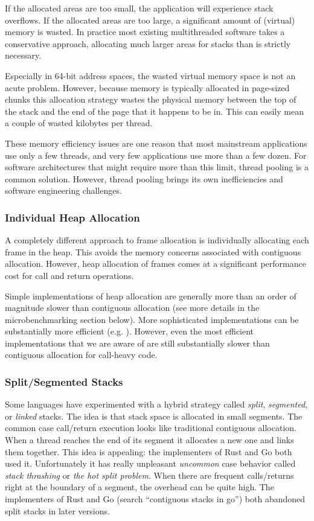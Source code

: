 \documentclass[9pt,preprint]{sigplanconf}
\begin{document}
If the allocated areas are too small, the application will experience stack overflows.
If the allocated areas are too large, a significant amount of (virtual) memory is wasted.
In practice most existing multithreaded software takes a conservative approach, allocating much larger areas for stacks than is strictly necessary.

Especially in 64-bit address spaces, the wasted virtual memory space is not an acute problem.
However, because memory is typically allocated in page-sized chunks this allocation strategy wastes the physical memory between the top of the stack and the end of the page that it happens to be in.
This can easily mean a couple of wasted kilobytes per thread.

These memory efficiency issues are one reason that most mainstream applications use only a few threads, and very few applications use more than a few dozen.
For software architectures that might require more than this limit, thread pooling is a common solution.
However, thread pooling brings its own inefficiencies and software engineering challenges.

\subsubsection{Individual Heap Allocation}

A completely different approach to frame allocation is individually allocating each frame in the heap.
This avoids the memory concerns associated with contiguous allocation.
However, heap allocation of frames comes at a significant performance cost for call and return operations.

Simple implementations of heap allocation are generally more than an order of magnitude slower than contiguous allocation (see more details in the microbenchmarking section below).
More sophisticated implementations can be substantially more efficient (e.g. \cite{Shao2000}).
However, even the most efficient implementations that we are aware of are still substantially slower than contiguous allocation for call-heavy code.

\subsubsection{Split/Segmented Stacks}

Some languages have experimented with a hybrid strategy called \emph{split}, \emph{segmented}, or \emph{linked} stacks.
The idea is that stack space is allocated in small segments.
The common case call/return execution looks like traditional contiguous allocation.
When a thread reaches the end of its segment it allocates a new one and links them together.
This idea is appealing: the implementers of Rust and Go both used it.
Unfortunately it has really unpleasant \emph{uncommon} case behavior called \emph{stack thrashing} or \emph{the hot split problem}.
When there are frequent calls/returns right at the boundary of a segment, the overhead can be quite high.
The implementers of Rust \cite{Anderson2013} and Go (search ``contiguous stacks in go'') both abandoned split stacks in later versions.
\end{document}
